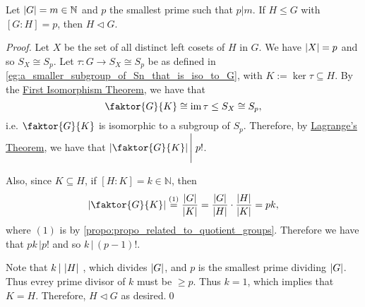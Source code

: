 \begin{crly}
\label{crly:subgroup_with_prime_index_dividing_order_of_group_is_normal}
  Let $\left|G\right| = m \in \mathbb{N}$ and $p$ the smallest prime such that $p \big| m$. If $H \leq G$ with $[G : H] = p$, then $H \triangleleft G$.
\end{crly}

\begin{proof}
  Let $X$ be the set of all distinct left cosets of $H$ in $G$. We have $\left|X\right| = p$ and so $S_X \cong S_p$. Let $\tau : G \to S_X \cong S_p$ be as defined in \cref{eg:a_smaller_subgroup_of_Sn_that_is_iso_to_G}, with $K := \ker \tau \subseteq H$. By the \hyperref[thm:first_isomorphism_theorem]{First Isomorphism Theorem}, we have that
  \begin{equation*}
    \faktor{G}{K} \cong \img \tau \leq S_X \cong S_p,
  \end{equation*}
  i.e. $\faktor{G}{K}$ is isomorphic to a subgroup of $S_p$. Therefore, by \hyperref[thm:lagrange_s_theorem]{Lagrange's Theorem}, we have that $\abs{\faktor{G}{K}} \Bigg| \; p!$.

  Also, since $K \subseteq H$, if $[H : K] = k \in \mathbb{N}$, then
  \begin{equation*}
    \abs{\faktor{G}{K}} \overset{(1)}{=}\frac{\abs{G}}{\abs{K}} = \frac{\abs{G}}{\abs{H}} \cdot \frac{\abs{H}}{\abs{K}} = pk,
  \end{equation*}
  where $(1)$ is by \cref{propo:propo_related_to_quotient_groups}. Therefore we have that $pk \, | p!$ and so $k \, | \, (p - 1)!$.
  
  Note that $k \, | \, \left|H\right|$ , which divides $\left|G\right|$, and $p$ is the smallest prime dividing $\left|G\right|$. Thus evrey prime divisor of $k$ must be $\geq p$. Thus $k = 1$, which implies that $K = H$. Therefore, $H \triangleleft G$ as desired.\qed
\end{proof}

